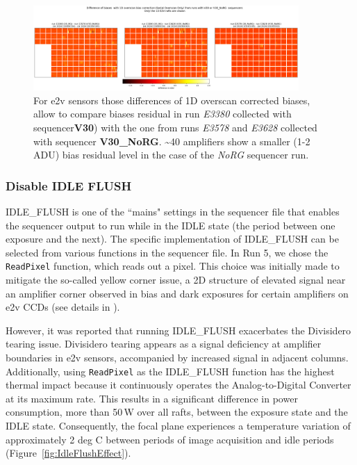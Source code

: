 \begin{figure}[ht]
\begin{centering}
\includegraphics[width=0.9\textwidth]{figures/PA_1D_filtred_RG_NoRG_FOnly_2024120200302_2024120200195_2024113000334.png}
\end{centering}
\caption{For e2v sensors those differences of 1D overscan corrected biases, allow to compare  biases residual in run {\it E3380} collected  with sequencer{\bf V30}) with the one from runs  {\it E3578} and {\it E3628} collected with sequencer {\bf V30\_NoRG}. \textasciitilde40 amplifiers show a smaller (1-2 ADU)  bias residual level in  the case of the {\it NoRG} sequencer run. }\label{fig:1DNoRGEffect}
\end{figure}

\clearpage

\subsubsection{Disable IDLE FLUSH}\label{section:disablingIDLEFLUSH}

IDLE\_FLUSH is one of the ``mains" settings in the sequencer file that enables the sequencer output to run while in the IDLE state (the period between one exposure and the next). The specific implementation of IDLE\_FLUSH can be selected from various functions in the sequencer file. In Run 5, we chose the \texttt{ReadPixel} function, which reads out a pixel. This choice was initially made to mitigate the so-called yellow corner issue, a 2D structure of elevated signal near an amplifier corner observed in bias and dark exposures for certain amplifiers on e2v CCDs (see details in \citet{2024SPIE13103E..0WU}).

However, it was reported that running IDLE\_FLUSH exacerbates the Divisidero tearing issue. Divisidero tearing appears as a signal deficiency at amplifier boundaries in e2v sensors, accompanied by increased signal in adjacent columns. Additionally, using \texttt{ReadPixel} as the IDLE\_FLUSH function has the highest thermal impact because it continuously operates the Analog-to-Digital Converter at its maximum rate. This results in a significant difference in power consumption, more than 50\,W over all rafts, between the exposure state and the IDLE state. Consequently, the focal plane experiences a temperature variation of approximately 2 deg C between periods of image acquisition and idle periods (Figure~\ref{fig:IdleFlushEffect}).

